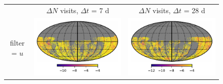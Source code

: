 \documentclass[preprintm,linenumbers]{aastex631}
\begin{document}
		\begin{figure}
			\centering
			\begin{tabular}{@{}c@{}c@{}c@{}}
				& $\Delta N$ visits, $\Delta t$ = 7 d & $\Delta N$ visits, $\Delta t$ = 28 d \\
				filter = $u$ & \includegraphics[align=t]{results/skymaps/skymaps_delta_first_year_one_snap_v4_0_10yrs_db_noDD_noTwi_CountMetric_doAllTemplateMetrics_reduceCount_u_7_noDD_noTwi} &				
				\includegraphics[align=t]{results/skymaps/skymaps_delta_first_year_one_snap_v4_0_10yrs_db_noDD_noTwi_CountMetric_doAllTemplateMetrics_reduceCount_u_28_noDD_noTwi} \\
				

\end{tabular}
\end{figure}
\end{document}
